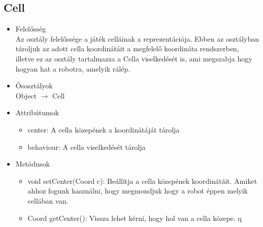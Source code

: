 
\subsection{Cell}
\begin{itemize}
\item Felelősség\\
Az osztály felelőssége a játék celláinak a reprezentációja. Ebben az osztályban tároljuk az adott cella koordinátáit a megfelelő koordináta rendszerben, illetve ez az osztály tartalmazza a Cella viselkedését is, ami megszabja hogy hogyan hat a robotra, amelyik rálép.

\item Ősosztályok\\
\newline
Object $\rightarrow$ Cell
\item Attribútumok\\
	\begin{itemize}
		\item center: A cella közepének a koordinátáját tárolja
		\item behaviour: A cella viselkedését tárolja
	\end{itemize}
\item Metódusok\\
	\begin{itemize}
		\item void setCenter(Coord c): Beállítja a cella közepének koordinátáit. Amiket ahhoz fogunk használni, hogy megmondjuk hogy a robot éppen melyik cellában van.
		\item Coord getCenter(): Vissza lehet kérni, hogy hol van a cella közepe.
		q
	\end{itemize}
\end{itemize}


